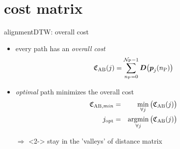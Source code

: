     \section[cost]{cost matrix}
        \begin{frame}{alignment}{DTW: overall cost}
            \vspace{-2mm}
            \begin{itemize}
                \item	every path has an \textit{overall cost}
                    \begin{equation*}
                        \mathfrak{C}_{\mathrm{AB}}(j) = \sum\limits_{n_\mathrm{P}= 0}^{\mathcal{N}_{\mathrm{P}}-1}{\mat{D}\big(\vec{P}_j(n_\mathrm{P})\big)} 
                    \end{equation*}
                \item<2->	\textit{optimal} path minimizes the overall cost
                    \begin{eqnarray*}
                        \mathfrak{C}_{\mathrm{AB},min} &=& \min\limits_{\forall j}\big(\mathfrak{C}_{\mathrm{AB}}(j)\big) \\
                        j_\mathrm{opt} 				&=& \operatorname*{argmin}\limits_{\forall j}\big(\mathfrak{C}_{\mathrm{AB}}(j)\big) 
                    \end{eqnarray*}
                \item[$\Rightarrow$]<2-> stay in the 'valleys' of distance matrix
            \end{itemize}
        \end{frame}
